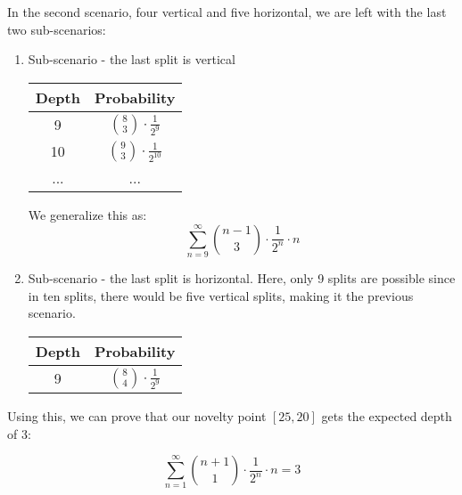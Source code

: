 In the second scenario, four vertical and five horizontal, we are left with the last two sub-scenarios:

\begin{enumerate}
    \item Sub-scenario - the last split is vertical
\begin{center}
\begin{tabular}{||c c||} 
 \hline
 Depth & Probability \\ [1ex] 
 \hline
 9 & $\binom{8}{3}\cdot \frac{1}{2^9}$\\ 
 \hline
 10 & $\binom{9}{3}\cdot \frac{1}{2^10}$  \\
 \hline
 ... & ... \\ [1ex] 
  \hline
\end{tabular}
\end{center}
We generalize this as: 
$$\sum_{n=9}^{\infty}\binom{n-1}{3}\cdot \frac{1}{2^n}\cdot n$$
\item Sub-scenario - the last split is horizontal. Here, only 9 splits are possible since in ten splits, there would be five vertical splits, making it the previous scenario.
    \begin{center}
\begin{tabular}{||c c||} 
 \hline
 Depth & Probability \\ [1ex] 
 \hline
 9 & $\binom{8}{4}\cdot \frac{1}{2^9}$\\ [1ex]
 \hline
\end{tabular}
\end{center}
\end{enumerate}

Using this, we can prove that our novelty point $[25,20]$ gets the expected depth of 3:

$$\sum_{n=1}^{\infty}\binom{n+1}{1}\cdot \frac{1}{2^n}\cdot n = 3$$
